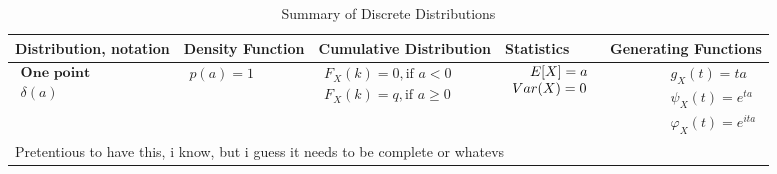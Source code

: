 \documentclass{article}
\begin{document}
\begin{landscape}
    \begin{table}[ht]
        \centering
        \caption{Summary of Discrete Distributions}
        \label{tab:probability_distributions}
        
        \begin{tabular}{@{}l p{6.0cm} p{5cm} p{3.0cm} r@{}}
        \toprule
        Distribution, notation & Density Function & Cumulative Distribution & Statistics & Generating Functions \\ 
        \midrule

    
        $\begin{array}{l}
            \textbf{One point} \\
            \delta(a) \\
    \end{array}$ & 
    $\begin{array}{l}
    \displaystyle p(a) = 1\\
    \end{array}$ & 
    $\begin{array}{l}
        \displaystyle F_X(k) = 0, \text{if } a < 0\\
        \displaystyle F_X(k) = q, \text{if } a \geq 0 \\
    \end{array}$ & 
    $\begin{array}{l}
    \displaystyle \hspace{0.45cm}  E[X] = a \\
    \displaystyle Var(X) = 0
    \end{array}$ & 
    $\begin{array}{r}
    \displaystyle g_X(t) = ta \\
    \displaystyle \psi_X(t) = e^{ta} \\
    \displaystyle \varphi_X(t) = e^{ita}
    \end{array}$ \\
    \multicolumn{4}{p{19cm}}{Pretentious to have this, i know, but i guess it needs to be complete or whatevs} \\



\end{tabular}
\end{table}
\end{landscape}
\end{document}
